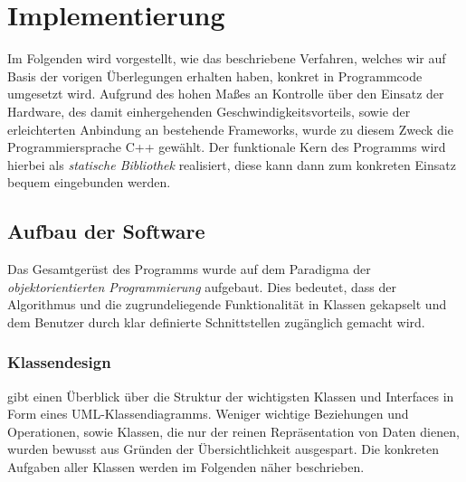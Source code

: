 \chapter{Implementierung}

Im Folgenden wird vorgestellt, wie das beschriebene Verfahren, welches wir auf Basis der vorigen
\"Uberlegungen erhalten haben, konkret in Programmcode umgesetzt wird. Aufgrund des hohen Ma{\ss}es an Kontrolle \"uber den Einsatz der
Hardware, des damit einhergehenden Geschwindigkeitsvorteils, sowie der erleichterten Anbindung an bestehende Frameworks, wurde zu
diesem Zweck die Programmiersprache C++ gew\"ahlt. Der funktionale Kern des Programms wird hierbei als \textit{statische Bibliothek}
realisiert, diese kann dann zum konkreten Einsatz bequem eingebunden werden.

\section{Aufbau der Software}

Das Gesamtger\"ust des Programms wurde auf dem Paradigma der \textit{objektorientierten Programmierung} aufgebaut. Dies bedeutet,
dass der Algorithmus
und die zugrundeliegende Funktionalit\"at in Klassen gekapselt und dem Benutzer durch klar definierte Schnittstellen zug\"anglich
gemacht wird.

\subsection{Klassendesign}

 gibt einen \"Uberblick \"uber die Struktur der wichtigsten Klassen und Interfaces in Form eines UML-Klassendiagramms.
Weniger wichtige Beziehungen und Operationen, sowie Klassen, die nur der reinen Repr\"asentation von Daten dienen, wurden bewusst
aus Gr\"unden der \"Ubersichtlichkeit ausgespart.
Die konkreten Aufgaben aller Klassen werden im Folgenden n\"aher beschrieben.

